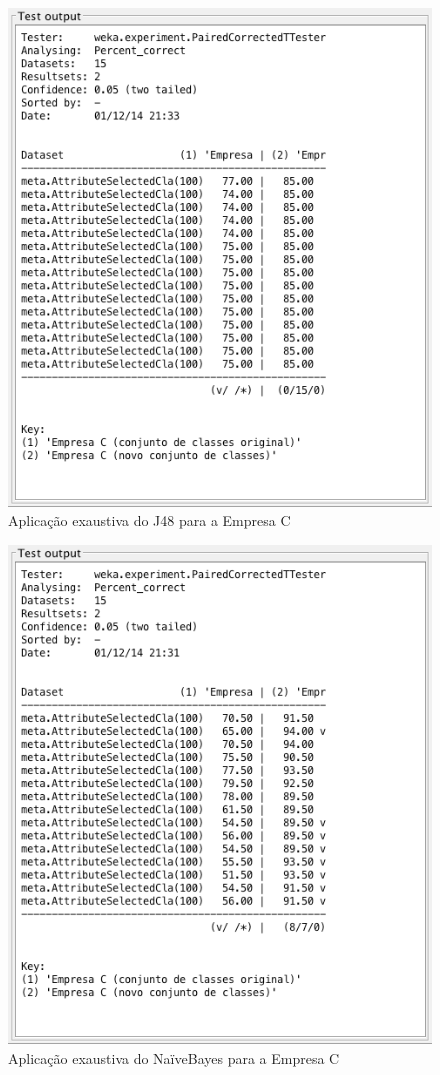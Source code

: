 \begin{figure}[p]
	\centering
	\includegraphics[width=\textwidth]{figs/empresa_c/exaustive-j48.png}
	\caption{\label{fig_17}Aplicação exaustiva do J48 para a Empresa C}
\end{figure}
\clearpage

\begin{figure}[p]
	\centering
	\includegraphics[width=\textwidth]{figs/empresa_c/exaustive-naivebayes.png}
	\caption{\label{fig_18}Aplicação exaustiva do NaïveBayes para a Empresa C}
\end{figure}
\clearpage